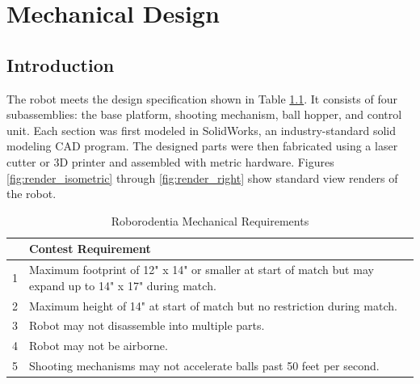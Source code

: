 \chapter{Mechanical Design}
\section{Introduction}
The robot meets the design specification shown in Table \ref{tab:roborodentia_reqs}. It consists of four subassemblies: the base platform, shooting mechanism, ball hopper, and control unit. Each section was first modeled in SolidWorks, an industry-standard solid modeling CAD program. The designed parts were then fabricated using a laser cutter or 3D printer and assembled with metric hardware. Figures \ref{fig:render_isometric} through \ref{fig:render_right} show standard view renders of the robot.

\begin{table}[h]
	\caption{Roborodentia Mechanical Requirements}
	\begin{tabular}{cp{5in}}
		\hline 
		& Contest Requirement \\ 
		\hline 
		1 & \ssp Maximum footprint of 12" x 14" or smaller at start of match but may expand up to 14" x 17" during match. \\ 
		\hline 
		2 & \ssp Maximum height of 14" at start of match but no restriction during match. \\ 
		\hline 
		3 & Robot may not disassemble into multiple parts. \\ 
		\hline 
		4 & Robot may not be airborne. \\ 
		\hline 
		5 & Shooting mechanisms may not accelerate balls past 50 feet per second. \\ 
		\hline 
	\end{tabular} 
	\label{tab:roborodentia_reqs}
\end{table}

